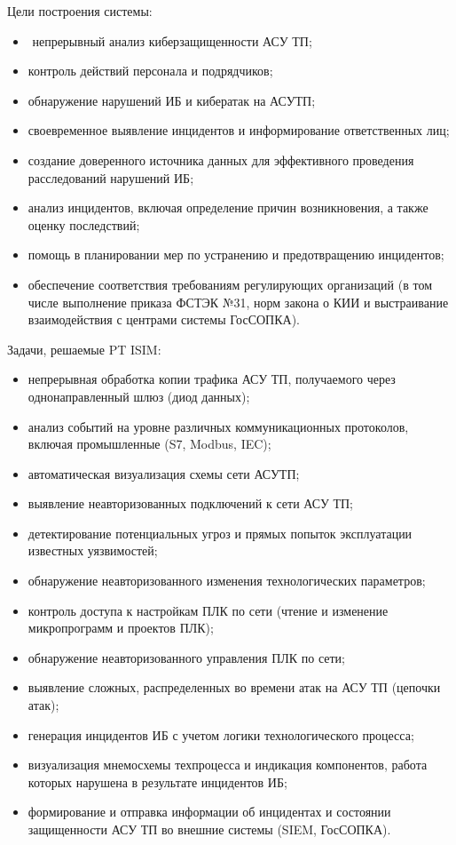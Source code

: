 Цели построения системы:
\begin{itemize}
    \item­ непрерывный анализ киберзащищенности АСУ ТП;
    \item контроль действий персонала и подрядчиков;
    \item обнаружение нарушений ИБ и кибератак на АСУТП;
    \item своевременное выявление инцидентов и информирование ответственных лиц;
    \item создание доверенного источника данных для эффективного проведения расследований нарушений ИБ;
    \item анализ инцидентов, включая определение причин возникновения, а также оценку последствий;
    \item помощь в планировании мер по устранению и предотвращению инцидентов;
    \item обеспечение соответствия требованиям регулирующих организаций (в том числе выполнение приказа ФСТЭК №31, норм закона о КИИ и выстраивание взаимодействия с центрами системы ГосСОПКА).
\end{itemize}

Задачи, решаемые PT ISIM:
\begin{itemize}
    \item непрерывная обработка копии трафика АСУ ТП, получаемого через однонаправленный шлюз (диод данных);
    \item анализ событий на уровне различных коммуникационных протоколов, включая промышленные (S7, Modbus, IEC);
    \item автоматическая визуализация схемы сети АСУТП;
    \item выявление неавторизованных подключений к сети АСУ ТП;
    \item детектирование потенциальных угроз и прямых попыток эксплуатации известных уязвимостей;
    \item обнаружение неавторизованного изменения технологических параметров;
    \item контроль доступа к настройкам ПЛК по сети (чтение и изменение микропрограмм и проектов ПЛК);
    \item обнаружение неавторизованного управления ПЛК по сети;
    \item выявление сложных, распределенных во времени атак на АСУ ТП (цепочки атак);
    \item генерация инцидентов ИБ с учетом логики технологического процесса;
    \item визуализация мнемосхемы техпроцесса и индикация компонентов, работа которых нарушена в результате инцидентов ИБ;
    \item формирование и отправка информации об инцидентах и состоянии защищенности АСУ ТП во внешние системы (SIEM, ГосСОПКА).\\
\end{itemize}

